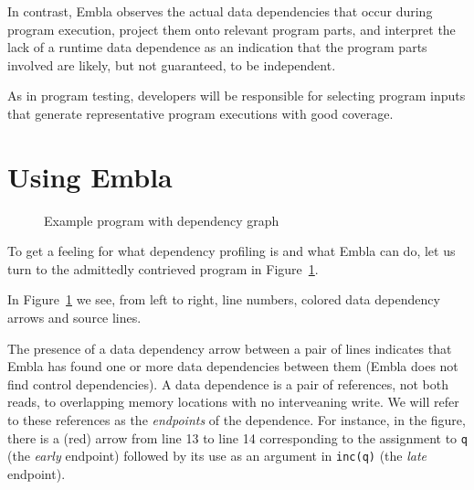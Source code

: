 \documentclass{acm_proc_article-sp}
\begin{document}
In contrast, Embla
observes the actual data dependencies that occur during program
execution, project them onto relevant program parts, and interpret the
lack of a runtime data dependence as an indication that the program
parts involved are likely, but not guaranteed, to be independent.


As in program testing, developers will be responsible for selecting
program inputs that generate representative program executions with
good coverage.



\section{Using Embla}

\begin{figure} 
\small

\caption{Example program with dependency graph} \label{ffirstex}
\end{figure}

To get a feeling for what dependency profiling is and what Embla can do, 
let us turn to the admittedly contrieved program in Figure~\ref{ffirstex}. 

In Figure~\ref{ffirstex} we see, from 
left to right, line numbers, colored data dependency arrows and source 
lines. 

The presence of a data dependency arrow between a pair of lines indicates
that Embla has found one or more data dependencies between them
(Embla does not find control dependencies). A data dependence is a pair
of references, not both reads, to overlapping memory
locations with no interveaning write. We will refer to these
references as the {\em endpoints} of the dependence.
For instance, in the figure, 
there is a (red) arrow from line 13 to line 14 corresponding to
the assignment to {\tt q} (the {\em early} endpoint) followed by its use 
as an argument in {\tt inc(q)} (the {\em late} endpoint).
\end{document}
